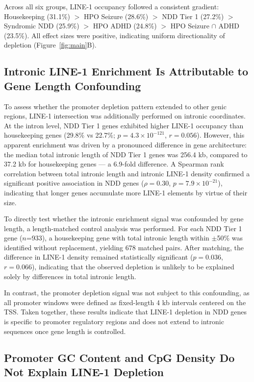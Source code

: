 \documentclass[preprints,briefreport,submit,pdftex,oneauthor]{Definitions/mdpi}
\newcommand{\Fig}[1]{Figure~\ref{#1}}
\begin{document}
Across all six groups, LINE-1 occupancy followed a consistent
gradient: Housekeeping (31.1\%) $>$ HPO Seizure (28.6\%) $>$
NDD Tier 1 (27.2\%) $>$ Syndromic NDD (25.9\%) $>$ HPO ADHD (24.8\%) $>$ HPO Seizure $\cap$ ADHD (23.5\%).
All effect sizes were positive, indicating uniform directionality
of depletion (\Fig{fig:main}B).

\subsection{Intronic LINE-1 Enrichment Is Attributable to
Gene Length Confounding}

To assess whether the promoter depletion pattern extended to
other genic regions, LINE-1 intersection was additionally
performed on intronic coordinates. At the intron level, NDD
Tier 1 genes exhibited higher LINE-1 occupancy than housekeeping
genes (29.8\% vs 22.7\%; $p = 4.3 \times 10^{-121}$,
$r = 0.056$). However, this apparent enrichment was driven by
a pronounced difference in gene architecture: the median total
intronic length of NDD Tier 1 genes was 256.4 kb, compared to
37.2 kb for housekeeping genes --- a 6.9-fold difference.
A Spearman rank correlation between total intronic length and
intronic LINE-1 density confirmed a significant positive
association in NDD genes ($\rho = 0.30$, $p = 7.9 \times 10^{-21}$),
indicating that longer genes accumulate more LINE-1 elements
by virtue of their size.

To directly test whether the intronic enrichment signal was
confounded by gene length, a length-matched control analysis
was performed. For each NDD Tier 1 gene ($n$=933), a
housekeeping gene with total intronic length within $\pm$50\%
was identified without replacement, yielding 678 matched pairs.
After matching, the difference in LINE-1 density remained statistically
significant ($p = 0.036$, $r = 0.066$), indicating that the
observed depletion is unlikely to be explained solely by
differences in total intronic length.

In contrast, the promoter depletion signal was not subject to
this confounding, as all promoter windows were defined as
fixed-length 4 kb intervals centered on the TSS.
Taken together, these results indicate that LINE-1 depletion in NDD
genes is specific to promoter regulatory regions and does not
extend to intronic sequences once gene length is controlled.


\subsection{Promoter GC Content and CpG Density Do Not Explain LINE-1 Depletion}
\end{document}
